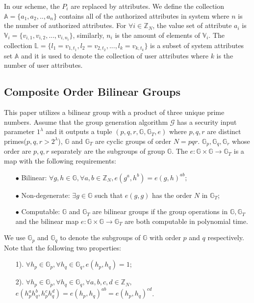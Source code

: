 \documentclass[smallextended]{svjour3}       %
\begin{document}
	In our scheme, the $P_i$ are replaced by attributes.
	We define the collection $\mathbb{A}=\{a_1,a_2,..,a_n\}$ contains all of the authorized attributes in system where $n$ is the number of authorized attributes. 
	For $\forall i \in \mathbb{Z}_N$, the value set of attribute $a_i$ is $\mathbb{V}_i=\{v_{i,1},v_{i,2},...,v_{i,n_i}\}$, similarly, $n_i$ is the amount of elements of $\mathbb{V}_i$.
	The collection $\mathbb{L}=\{l_1=v_{1,t_1},l_2=v_{2,t_2},...,l_k=v_{k,t_k}\}$ is a subset of system attributes set $\mathbb{A}$ and it is used to denote the collection of user attributes where $k$ is the number of user attributes.  

\subsection{Composite Order Bilinear Groups}
	This paper utilizes a bilinear group with a product of three unique prime numbers. 
	Assume that the group generation algorithm $\mathcal{G}$ has a security input parameter $1^{\lambda}$ and it outputs a tuple $(p,q,r,\mathbb{G},\mathbb{G}_{T},e)$ where $p,q,r$ are distinct primes($p,q,r>2^{\lambda}$), $\mathbb{G}$ and $\mathbb{G}_{T}$ are cyclic groups of order 
	$N=pqr$. $\mathbb{G}_{p},\mathbb{G}_{q},\mathbb{G}_{r}$ 
	whose order are ${p,q,r}$ separately are the subgroups of group $\mathbb{G}$. 
	The $e:\mathbb{G}\times\mathbb{G}\to\mathbb{G}_{T}$ is a map with the following requirements:
\begin{itemize}
	\item[$\bullet$] Bilinear: $\forall g,h \in \mathbb{G}, \forall a,b \in \mathbb{Z}_{N},e(g^a,h^b)=e(g,h)^{ab};$
	\item[$\bullet$] Non-degenerate: $\exists g \in \mathbb{G}$ such that $e(g,g)$ has the order $N$ in $\mathbb{G}_{T}$;
	\item[$\bullet$] Computable: $\mathbb{G}$ and $\mathbb{G}_{T}$ are bilinear groups if the group operations in  $\mathbb{G},\mathbb{G}_{T}$ and the bilinear map $e:\mathbb{G}\times\mathbb{G}\to\mathbb{G}_{T}$ are both computable in polynomial time.
\end{itemize}
	We use $\mathbb{G}_p$ and $\mathbb{G}_q$ to denote the subgroups of $\mathbb{G}$ with order $p$ and $q$ respectively. Note that the following two properties:
\begin{itemize}
	\item [1).] $\forall h_p \in \mathbb{G}_p, \forall h_q \in \mathbb{G}_q, e(h_p,h_q)=1$;
	\item [2).] $\forall h_p \in \mathbb{G}_p, \forall h_q \in \mathbb{G}_q, \forall a,b,c,d \in \mathbb{Z}_N,$\\ $e(h_{p}^{a}h_{q}^{b},h_{p}^{c}h_{q}^{d})=e(h_p,h_q)^{ab}=e(h_p,h_q)^{cd}$.
\end{itemize}
\end{document}
